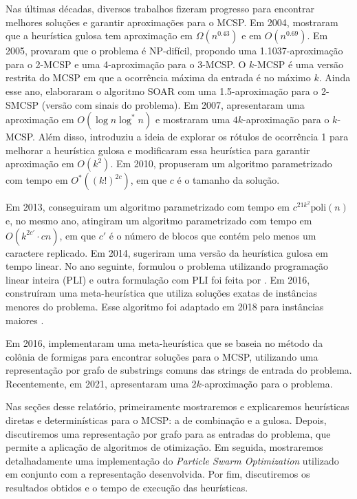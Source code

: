 Nas últimas décadas, diversos trabalhos fizeram progresso para encontrar melhores soluções e garantir aproximações para o MCSP. Em 2004, \textcite{chrobak_greedy_2004} mostraram que a heurística gulosa tem aproximação em $\Omega(n^{0.43})$ e em $O(n^{0.69})$. Em 2005, \textcite{goldstein_minimum_2005} provaram que o problema é NP-difícil, propondo uma 1.1037-aproximação para o 2-MCSP e uma 4-aproximação para o 3-MCSP. O $k$-MCSP é uma versão restrita do MCSP em que a ocorrência máxima da entrada é no máximo $k$. Ainda esse ano, \textcite{chen_assignment_2005} elaboraram o algoritmo SOAR com uma 1.5-aproximação para o 2-SMCSP (versão com sinais do problema). Em 2007, \textcite{cormode_string_2007} apresentaram uma aproximação em $O(\log n \log^* n)$ e \textcite{kolman_reversal_2007} mostraram uma $4k$-aproximação para o $k$-MCSP. Além disso, \textcite{mandoiu_novel_2007} introduziu a ideia de explorar os rótulos de ocorrência 1 para melhorar a heurística gulosa e \textcite{kolman_approximating_2007} modificaram essa heurística para garantir aproximação em $O(k^2)$. Em 2010, \textcite{jiang_minimum_2012} propuseram um algoritmo parametrizado com tempo em $O^*((k!)^{2c})$, em que $c$ é o tamanho da solução.

Em 2013, \textcite{bulteau_minimum_2014} conseguiram um algoritmo parametrizado com tempo em $c^{21k^2} \text{poli}(n)$ e, no mesmo ano, \textcite{bulteau_fixed-parameter_2013} atingiram um algoritmo parametrizado com tempo em $O(k^{2c'} \cdot cn)$, em que $c'$ é o número de blocos que contém pelo menos um caractere replicado. Em 2014, \textcite{goldstein_quick_2014} sugeriram uma versão da heurística gulosa em tempo linear. No ano seguinte, \textcite{blum_mathematical_2015} formulou o problema utilizando programação linear inteira (PLI) e outra formulação com PLI foi feita por \textcite{blum_computational_2016}. Em 2016, \textcite{blum_construct_2016} construíram uma meta-heurística que utiliza soluções exatas de instâncias menores do problema. Esse algoritmo foi adaptado em 2018 para instâncias maiores \cite{blum_minimum_2018}.

Em 2016, \textcite{ferdous_solving_2017} implementaram uma meta-heurística que se baseia no método da colônia de formigas para encontrar soluções para o MCSP, utilizando uma representação por grafo de substrings comuns das strings de entrada do problema. Recentemente, em 2021, \textcite{siqueira_signed_2023} apresentaram uma $2k$-aproximação para o problema.

Nas seções desse relatório, primeiramente mostraremos e explicaremos heurísticas diretas e determinísticas para o MCSP: a de combinação e a gulosa. Depois, discutiremos uma representação por grafo para as entradas do problema, que permite a aplicação de algoritmos de otimização. Em seguida, mostraremos detalhadamente uma implementação do \textit{Particle Swarm Optimization} utilizado em conjunto com a representação desenvolvida. Por fim, discutiremos os resultados obtidos e o tempo de execução das heurísticas.
